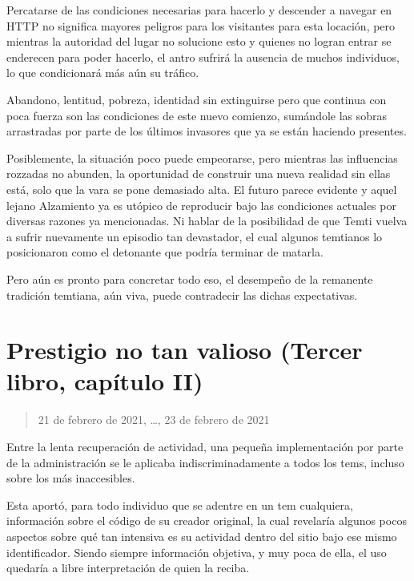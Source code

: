 \documentclass[
  spanish,
]{book}
\begin{document}
Percatarse de las condiciones necesarias para hacerlo y descender a navegar en HTTP no significa mayores peligros para los visitantes para esta locación, pero mientras la autoridad del lugar no solucione esto y quienes no logran entrar se enderecen para poder hacerlo, el antro sufrirá la ausencia de muchos individuos, lo que condicionará más aún su tráfico.

Abandono, lentitud, pobreza, identidad sin extinguirse pero que continua con poca fuerza son las condiciones de este nuevo comienzo, sumándole las sobras arrastradas por parte de los últimos invasores que ya se están haciendo presentes.

Posiblemente, la situación poco puede empeorarse, pero mientras las influencias rozzadas no abunden, la oportunidad de construir una nueva realidad sin ellas está, solo que la vara se pone demasiado alta. El futuro parece evidente y aquel lejano Alzamiento ya es utópico de reproducir bajo las condiciones actuales por diversas razones ya mencionadas. Ni hablar de la posibilidad de que Temti vuelva a sufrir nuevamente un episodio tan devastador, el cual algunos temtianos lo posicionaron como el detonante que podría terminar de matarla.

Pero aún es pronto para concretar todo eso, el desempeño de la remanente tradición temtiana, aún viva, puede contradecir las dichas expectativas.

\hypertarget{prestigio-no-tan-valioso-tercer-libro-capuxedtulo-ii}{%
\section{Prestigio no tan valioso (Tercer libro, capítulo II)}\label{prestigio-no-tan-valioso-tercer-libro-capuxedtulo-ii}}

\begin{quote}
21 de febrero de 2021, \ldots, 23 de febrero de 2021
\end{quote}

Entre la lenta recuperación de actividad, una pequeña implementación por parte de la administración se le aplicaba indiscriminadamente a todos los tems, incluso sobre los más inaccesibles.

Esta aportó, para todo individuo que se adentre en un tem cualquiera, información sobre el código de su creador original, la cual revelaría algunos pocos aspectos sobre qué tan intensiva es su actividad dentro del sitio bajo ese mismo identificador. Siendo siempre información objetiva, y muy poca de ella, el uso quedaría a libre interpretación de quien la reciba.
\end{document}

